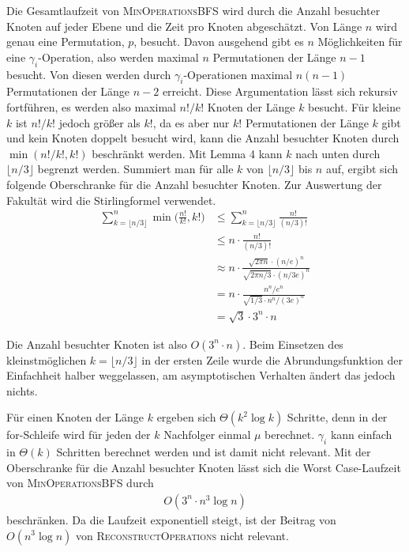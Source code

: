 \documentclass[a4paper, 10pt, ngerman]{article}
\begin{document}
Die Gesamtlaufzeit von \textsc{MinOperationsBFS} wird durch die Anzahl besuchter Knoten auf jeder Ebene und die Zeit pro Knoten abgeschätzt. Von Länge $n$ wird genau eine Permutation, $p$, besucht. Davon ausgehend gibt es $n$ Möglichkeiten für eine $\gamma_i$-Operation, also werden maximal $n$ Permutationen der Länge $n - 1$ besucht. Von diesen werden durch $\gamma_i$-Operationen maximal $n(n-1)$ Permutationen der Länge $n - 2$ erreicht. Diese Argumentation lässt sich rekursiv fortführen, es werden also maximal $n! / k!$ Knoten der Länge $k$ besucht. Für kleine $k$ ist $n! / k!$ jedoch größer als $k!$, da es aber nur $k!$ Permutationen der Länge $k$ gibt und kein Knoten doppelt besucht wird, kann die Anzahl besuchter Knoten durch $\min(n! / k!, k!)$ beschränkt werden. Mit Lemma 4 kann $k$ nach unten durch $\lfloor n/3 \rfloor$ begrenzt werden. Summiert man für alle $k$ von $\lfloor n/3 \rfloor$ bis $n$ auf, ergibt sich folgende Oberschranke für die Anzahl besuchter Knoten. Zur Auswertung der Fakultät wird die Stirlingformel verwendet.
\begin{align*}
    \sum_{k = \lfloor n/3 \rfloor}^n \min \bigg ( \frac {n!}{k!}, k! \bigg )
     & \le \sum_{k = \lfloor n/3 \rfloor}^n  \frac {n!} {(n/3)!}
    \\ & \le n \cdot \frac {n!} {(n/3)!}
    \\ & \approx n \cdot
    \frac {\sqrt{2 \pi n} \cdot (n/e)^n} {\sqrt{2 \pi n/3} \cdot (n/3e)^n}
    \\ & = n \cdot
    \frac {n^n / e^n} {\sqrt{1/3} \cdot n^n / (3e)^n}
    \\ & = \sqrt 3 \cdot 3^n \cdot n
\end{align*}

Die Anzahl besuchter Knoten ist also $O(3^n \cdot n)$. Beim Einsetzen des kleinstmöglichen $k = \lfloor n/3 \rfloor$ in der ersten Zeile wurde die Abrundungsfunktion der Einfachheit halber weggelassen, am asymptotischen Verhalten ändert das jedoch nichts.

Für einen Knoten der Länge $k$ ergeben sich $\Theta(k^2 \log k)$ Schritte, denn in der for-Schleife wird für jeden der $k$ Nachfolger einmal $\mu$ berechnet. $\gamma_i$ kann einfach in $\Theta(k)$ Schritten berechnet werden und ist damit nicht relevant. Mit der Oberschranke für die Anzahl besuchter Knoten lässt sich die Worst Case-Laufzeit von \textsc{MinOperationsBFS} durch
\begin{align*}
    O(3^n \cdot n^3 \log n)
\end{align*}
beschränken. Da die Laufzeit exponentiell steigt, ist der Beitrag von $O(n^3 \log n)$ von \textsc{ReconstructOperations} nicht relevant.
\end{document}
